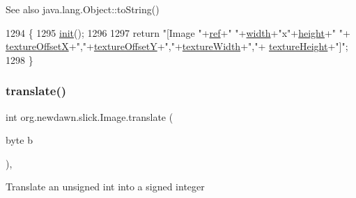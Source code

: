 \begin{DoxySeeAlso}{See also}
java.\+lang.\+Object\+::to\+String() 
\end{DoxySeeAlso}

\begin{DoxyCode}
1294                              \{
1295         \mbox{\hyperlink{classorg_1_1newdawn_1_1slick_1_1_image_a94d180c9218ba1444a0496a1898ec345}{init}}();
1296         
1297         \textcolor{keywordflow}{return} \textcolor{stringliteral}{"[Image "}+\mbox{\hyperlink{classorg_1_1newdawn_1_1slick_1_1_image_a32694687591a80299d8b8ad1ea070cee}{ref}}+\textcolor{stringliteral}{" "}+\mbox{\hyperlink{classorg_1_1newdawn_1_1slick_1_1_image_a7d02c85e21b388428cfe5cc5c82714a1}{width}}+\textcolor{stringliteral}{"x"}+\mbox{\hyperlink{classorg_1_1newdawn_1_1slick_1_1_image_a54397a37823bc59ddc79ec70dc5cf226}{height}}+\textcolor{stringliteral}{"  "}+
      \mbox{\hyperlink{classorg_1_1newdawn_1_1slick_1_1_image_a0d11936067f8ad706c42a5feb411b5c8}{textureOffsetX}}+\textcolor{stringliteral}{","}+\mbox{\hyperlink{classorg_1_1newdawn_1_1slick_1_1_image_a5c542a6d5fccbb7d56d74129b05cb78d}{textureOffsetY}}+\textcolor{stringliteral}{","}+\mbox{\hyperlink{classorg_1_1newdawn_1_1slick_1_1_image_a0beda6fc601023aff97cce0d20d81f1e}{textureWidth}}+\textcolor{stringliteral}{","}+
      \mbox{\hyperlink{classorg_1_1newdawn_1_1slick_1_1_image_a048cc714a1282eac215dbe4e722a3146}{textureHeight}}+\textcolor{stringliteral}{"]"};
1298     \}
\end{DoxyCode}
\mbox{\label{classorg_1_1newdawn_1_1slick_1_1_image_a18427cc301ec2a3e6f7a2906d797e9ba}} 
\subsubsection{\texorpdfstring{translate()}{translate()}}
{\footnotesize\ttfamily int org.\+newdawn.\+slick.\+Image.\+translate (\begin{DoxyParamCaption}\item[{byte}]{b }\end{DoxyParamCaption})\hspace{0.3cm}{\ttfamily [inline]}, {\ttfamily [private]}}

Translate an unsigned int into a signed integer


